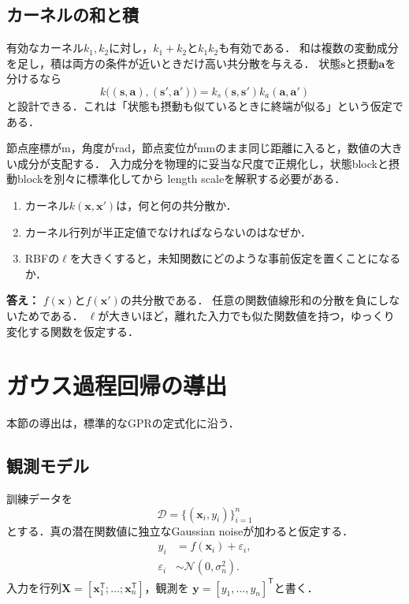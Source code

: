 \documentclass[a4paper,11pt]{ltjsarticle}
\newcommand{\N}{\mathcal N}
\newcommand{\D}{\mathcal D}
\newcommand{\T}{\mathsf T}
\begin{document}
\subsection{カーネルの和と積}

有効なカーネル\(k_1,k_2\)に対し，\(k_1+k_2\)と\(k_1k_2\)も有効である．
和は複数の変動成分を足し，積は両方の条件が近いときだけ高い共分散を与える．
状態\(\bm s\)と摂動\(\bm a\)を分けるなら
\begin{equation}
  k\bigl((\bm s,\bm a),(\bm s',\bm a')\bigr)
  =k_s(\bm s,\bm s')k_a(\bm a,\bm a')
  \label{eq:state-action-product-kernel}
\end{equation}
と設計できる．これは「状態も摂動も似ているときに終端が似る」という仮定である．

\begin{cautionbox}
節点座標がm，角度がrad，節点変位がmmのまま同じ距離に入ると，数値の大きい成分が支配する．
入力成分を物理的に妥当な尺度で正規化し，状態blockと摂動blockを別々に標準化してから
length scaleを解釈する必要がある．
\end{cautionbox}

\begin{checkpointbox}
\begin{enumerate}
  \item カーネル\(k(\bm x,\bm x')\)は，何と何の共分散か．
  \item カーネル行列が半正定値でなければならないのはなぜか．
  \item RBFの\(\ell\)を大きくすると，未知関数にどのような事前仮定を置くことになるか．
\end{enumerate}
\textbf{答え：} \(f(\bm x)\)と\(f(\bm x')\)の共分散である．
任意の関数値線形和の分散を負にしないためである．
\(\ell\)が大きいほど，離れた入力でも似た関数値を持つ，ゆっくり変化する関数を仮定する．
\end{checkpointbox}

\section{ガウス過程回帰の導出}
\label{sec:gpr-derivation}

本節の導出は，標準的なGPRの定式化\citep{rasmussen2006gpml}に沿う．

\subsection{観測モデル}

訓練データを
\begin{equation}
  \D=\{(\bm x_i,y_i)\}_{i=1}^n
\end{equation}
とする．真の潜在関数値に独立なGaussian noiseが加わると仮定する．
\begin{align}
  y_i&=f(\bm x_i)+\varepsilon_i,\\
  \varepsilon_i&\sim\N(0,\sigma_n^2).
  \label{eq:gpr-observation-model}
\end{align}
入力を行列\(\bm X=[\bm x_1^\T;\ldots;\bm x_n^\T]\)，観測を
\(\bm y=[y_1,\ldots,y_n]^\T\)と書く．
\end{document}

